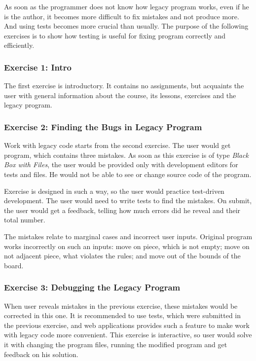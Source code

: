         As soon as the programmer does not know how legacy program works, even if he is the author, it becomes more difficult to fix mistakes and not produce more. And using tests becomes more crucial than usually. The purpose of the following exercises is to show how testing is useful for fixing program correctly and efficiently.
        
            \subsubsection{Exercise 1: Intro}
            The first exercise is introductory. It contains no assignments, but acquaints the user with general information about the course, its lessons, exercises and the legacy program.
            
            \subsubsection{Exercise 2: Finding the Bugs in Legacy Program}
            Work with legacy code starts from the second exercise. The user would get program, which contains three mistakes. As soon as this exercise is of type \textit{Black Box with Files}, the user would be provided only with development editors for tests and files. He would not be able to see or change source code of the program.
            
            Exercise is designed in such a way, so the user would practice test-driven development. The user would need to write tests to find the mistakes. On submit, the user would get a feedback, telling how much errors did he reveal and their total number.
            
            The mistakes relate to marginal cases and incorrect user inputs. Original program works incorrectly on such an inputs: move on piece, which is not empty; move on not adjacent piece, what violates the rules; and move out of the bounds of the board.
            
            \subsubsection{Exercise 3: Debugging the Legacy Program}
            When user reveals mistakes in the previous exercise, these mistakes would be corrected in this one. It is recommended to use tests, which were submitted in the previous exercise, and web applications provides such a feature to make work with legacy code more convenient. This exercise is interactive, so user would solve it with changing the program files, running the modified program and get feedback on his solution.
            

